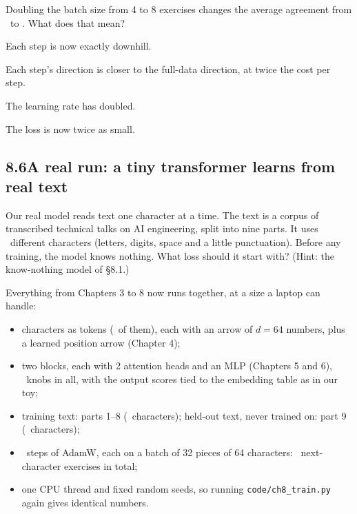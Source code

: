 \begin{checkq}
Doubling the batch size from 4 to 8 exercises changes the average agreement from \nEightBatchCosFour\ to
\nEightBatchCosEight. What does that mean?
\begin{options}
\item Each step is now exactly downhill.
\item Each step's direction is closer to the full-data direction, at twice the cost per step.
\item The learning rate has doubled.
\item The loss is now twice as small.
\end{options}
\end{checkq}


\subsection*{8.6\quad A real run: a tiny transformer learns from real text}

\Predict Our real model reads text one character at a time. The text is a corpus of transcribed technical
talks on AI engineering, split into nine parts. It uses \nEightRunV\ different
characters (letters, digits, space and a little punctuation). Before any training, the model knows nothing.
What loss should it start with? (Hint: the know-nothing model of \S8.1.)

Everything from Chapters 3 to 8 now runs together, at a size a laptop can handle:
\begin{itemize}
\item characters as tokens (\nEightRunV\ of them), each with an arrow of $d=64$ numbers, plus a learned
position arrow (Chapter 4);
\item two blocks, each with 2 attention heads and an MLP (Chapters 5 and 6), \nEightRunParams\ knobs in all,
with the output scores tied to the embedding table as in our toy;
\item training text: parts 1--8 (\nEightRunTrainChars\ characters); held-out text, never trained on:
part 9 (\nEightRunValChars\ characters);
\item \nEightRunSteps\ steps of AdamW, each on a batch of 32 pieces of 64 characters: \nEightRunTokensSeen\
next-character exercises in total;
\item one CPU thread and fixed random seeds, so running \texttt{code/ch8\_train.py} again gives identical
numbers.
\end{itemize}

